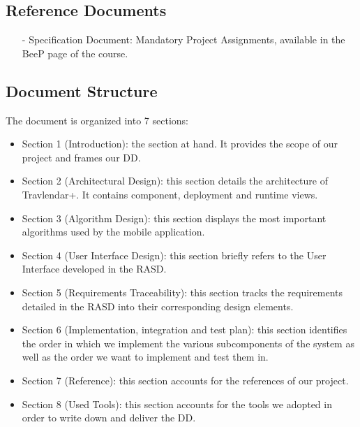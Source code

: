 \subsection{Reference Documents}
\begin{itemize}
		\item[-] \textsf{Specification Document: Mandatory Project Assignments}, available in the BeeP page of the course.
\end{itemize} 

\subsection{Document Structure}
The document is organized into 7 sections:

\begin{itemize}
	\item Section 1  (Introduction): the section at hand. It provides the scope of our project and frames our DD.
	\item Section 2 (Architectural Design): this section details the architecture of Travlendar+. It contains component, deployment and runtime views.
	\item Section 3 (Algorithm Design): this section displays the most important algorithms used by the mobile application.
	\item Section 4 (User Interface Design): this section briefly refers to the User Interface developed in the RASD.
	\item Section 5 (Requirements Traceability): this section tracks the requirements detailed in the RASD into their corresponding design elements.
	\item Section 6 (Implementation, integration and test plan): this section identifies the order in which we implement the various subcomponents of the system as well as the order we want to implement and test them in.
	\item Section  7 (Reference): this section accounts for the references of our project.
	\item Section 8 (Used Tools): this section accounts for the tools we adopted in order to write down and deliver the DD.
\end{itemize}
